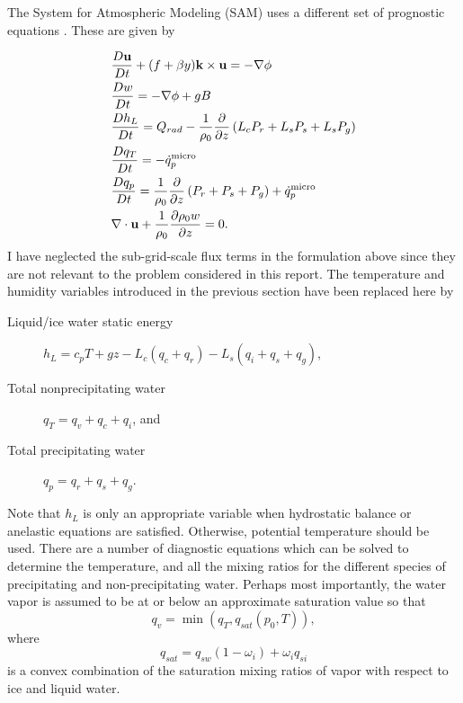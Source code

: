 \documentclass{report}
\begin{document}
The System for Atmospheric Modeling (SAM) uses a different set of prognostic
equations \autocite{Khairoutdinov2003}. These are given by

\begin{subequations}
  \label{eq:sam}
  \begin{align}
    &\frac{D \mathbf{u}}{D t} + ( f  + \beta y) \mathbf{k}\times \mathbf{u} = - \nabla \phi \\
    &\frac{D w}{D t} = -\nabla \phi + g B \label{eq:w-full}\\
    &\frac{D h_L}{D t}  = Q_{rad}  - \frac{1}{\rho_0} \frac{\partial }{\partial z} \left( L_c P_r + L_s P_s + L_s P_g \right)\\
    &\frac{D q_T}{D t} = -  \dot{q}_p^{\text{micro}} \label{eq:sam-qT}\\
    &\frac{D q_p}{D t} = \frac{1}{\rho_0} \frac{\partial }{\partial z} \left(  P_r +  P_s + P_g \right) + \dot{q}_p^{\text{micro}}\\
    &\nabla \cdot \mathbf{u} + \frac{1}{\rho_0} \frac{\partial \rho_0 w}{\partial z}  = 0.
  \end{align}
\end{subequations}
I have neglected the sub-grid-scale flux terms in the formulation above since
they are not relevant to the problem considered in this report. The temperature
and humidity variables introduced in the previous section have been replaced
here by
\begin{description}
\item[Liquid/ice water static energy] $h_L = c_p T +gz - L_c (q_c + q_r) - L_s
  (q_i + q_s + q_g)$,
\item[Total nonprecipitating water] $q_T = q_v + q_c + q_i$, and
\item[Total precipitating water] $q_p = q_r + q_s + q_g$.
\end{description}
Note that $h_L$ is only an appropriate variable when hydrostatic balance or
anelastic equations are satisfied. Otherwise, potential temperature should be
used. There are a number of diagnostic equations which can be solved to
determine the temperature, and all the mixing ratios for the different species
of precipitating and non-precipitating water. Perhaps most importantly, the
water vapor is assumed to be at or below an approximate saturation value so that
\[q_v = \min(q_T, q_{sat}(p_0, T)),\]
where
\[ q_{sat} = q_{sw} (1-\omega_i) + \omega_i q_{si}\]
is a convex combination of the saturation mixing ratios of vapor with respect to
ice and liquid water. 
\end{document}
